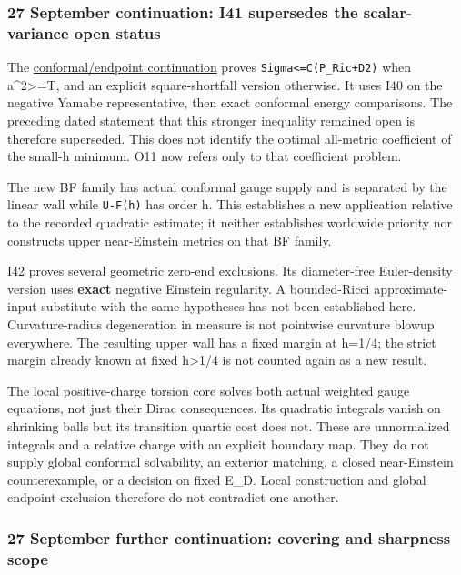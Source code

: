 \documentclass[
  10pt,
]{article}
\begin{document}
\hypertarget{september-continuation-i41-supersedes-the-scalar-variance-open-status}{%
\subsubsection{27 September continuation: I41 supersedes the
scalar-variance open
status}\label{september-continuation-i41-supersedes-the-scalar-variance-open-status}}

The
\href{../continuation/20260927_conformal_separation_and_zero_end.md}{conformal/endpoint
continuation} proves \texttt{Sigma\textless{}=C(P\_Ric+D2)} when
a\^{}2\textgreater=T, and an explicit square-shortfall version
otherwise. It uses I40 on the negative Yamabe representative, then exact
conformal energy comparisons. The preceding dated statement that this
stronger inequality remained open is therefore superseded. This does not
identify the optimal all-metric coefficient of the small-h minimum. O11
now refers only to that coefficient problem.

The new BF family has actual conformal gauge supply and is separated by
the linear wall while \texttt{U-F(h)} has order h. This establishes a
new application relative to the recorded quadratic estimate; it neither
establishes worldwide priority nor constructs upper near-Einstein
metrics on that BF family.

I42 proves several geometric zero-end exclusions. Its diameter-free
Euler-density version uses \textbf{exact} negative Einstein regularity.
A bounded-Ricci approximate-input substitute with the same hypotheses
has not been established here. Curvature-radius degeneration in measure
is not pointwise curvature blowup everywhere. The resulting upper wall
has a fixed margin at h=1/4; the strict margin already known at fixed
h\textgreater1/4 is not counted again as a new result.

The local positive-charge torsion core solves both actual weighted gauge
equations, not just their Dirac consequences. Its quadratic integrals
vanish on shrinking balls but its transition quartic cost does not.
These are unnormalized integrals and a relative charge with an explicit
boundary map. They do not supply global conformal solvability, an
exterior matching, a closed near-Einstein counterexample, or a decision
on fixed E\_D. Local construction and global endpoint exclusion
therefore do not contradict one another.

\hypertarget{september-further-continuation-covering-and-sharpness-scope}{%
\subsubsection{27 September further continuation: covering and sharpness
scope}\label{september-further-continuation-covering-and-sharpness-scope}}
\end{document}
